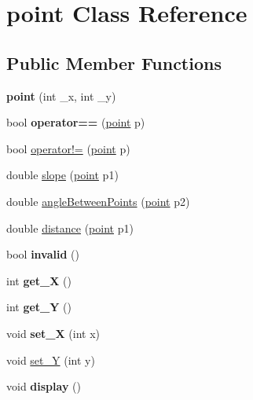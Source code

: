 \hypertarget{classpoint}{
\section{point Class Reference}
\label{classpoint}
}
\subsection*{Public Member Functions}
\begin{DoxyCompactItemize}
\item 
\hypertarget{classpoint_aa88449134280c0bc569f86fa98785ec0}{
{\bfseries point} (int \_\-x, int \_\-y)}
\label{classpoint_aa88449134280c0bc569f86fa98785ec0}

\item 
\hypertarget{classpoint_a1b726e5c7b1c25647d685fe48d9a6e39}{
bool {\bfseries operator==} (\hyperlink{classpoint}{point} p)}
\label{classpoint_a1b726e5c7b1c25647d685fe48d9a6e39}

\item 
bool \hyperlink{classpoint_a37e9a3ccade55cb6a424888737098571}{operator!=} (\hyperlink{classpoint}{point} p)
\item 
double \hyperlink{classpoint_a28c43f3dbee6708f604346ec918c0286}{slope} (\hyperlink{classpoint}{point} p1)
\item 
double \hyperlink{classpoint_aac62db6bc3e2f7d35950ffa8789fde18}{angleBetweenPoints} (\hyperlink{classpoint}{point} p2)
\item 
double \hyperlink{classpoint_aa1af528ca96a10e9d3a3e6b1af7112ee}{distance} (\hyperlink{classpoint}{point} p1)
\item 
\hypertarget{classpoint_a58da89079c34bdc898a0ef8117648ae5}{
bool {\bfseries invalid} ()}
\label{classpoint_a58da89079c34bdc898a0ef8117648ae5}

\item 
\hypertarget{classpoint_a3d31b560b17fcf65bea36469e49a6fb4}{
int {\bfseries get\_\-X} ()}
\label{classpoint_a3d31b560b17fcf65bea36469e49a6fb4}

\item 
\hypertarget{classpoint_aa8d43ec6f46ac2ab3251bf188df582d9}{
int {\bfseries get\_\-Y} ()}
\label{classpoint_aa8d43ec6f46ac2ab3251bf188df582d9}

\item 
\hypertarget{classpoint_a584a6daa9ea5e8204be3b1a610cee9e1}{
void {\bfseries set\_\-X} (int x)}
\label{classpoint_a584a6daa9ea5e8204be3b1a610cee9e1}

\item 
void \hyperlink{classpoint_ad17be1d73dfe1af57d7f2ce25bb05732}{set\_\-Y} (int y)
\item 
\hypertarget{classpoint_a0b248ae2a8dab47a95f68ffb03f33ede}{
void {\bfseries display} ()}
\label{classpoint_a0b248ae2a8dab47a95f68ffb03f33ede}

\end{DoxyCompactItemize}


